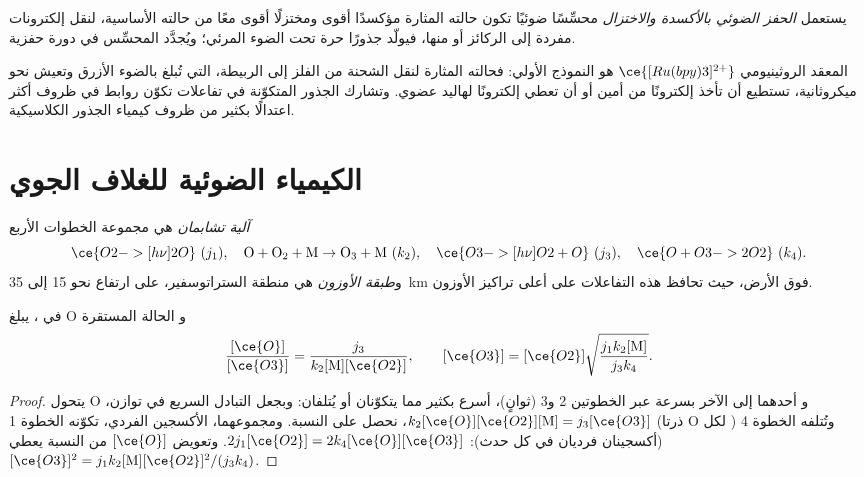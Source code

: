 \begin{definition}\label{def:b3:photochemistry:photoredox}
يستعمل \emph{الحفز الضوئي بالأكسدة والاختزال} محسِّسًا ضوئيًا
تكون حالته المثارة مؤكسدًا أقوى ومختزلًا أقوى معًا من
حالته الأساسية، لنقل إلكترونات مفردة إلى الركائز أو منها، فيولّد
جذورًا حرة تحت الضوء المرئي؛ ويُجدَّد المحسِّس في دورة
حفزية.
\end{definition}

المعقد الروثينيومي $\ce{[Ru(bpy)3]^{2+}}$ هو النموذج الأولي: فحالته المثارة لنقل الشحنة من الفلز إلى
الربيطة، التي تُبلغ بالضوء الأزرق وتعيش نحو
ميكروثانية، تستطيع أن تأخذ إلكترونًا من أمين أو أن تعطي إلكترونًا لهاليد
عضوي. وتشارك الجذور المتكوّنة في تفاعلات تكوّن روابط في
ظروف أكثر اعتدالًا بكثير من ظروف كيمياء الجذور الكلاسيكية.

\section{الكيمياء الضوئية للغلاف الجوي}

\begin{definition}\label{def:b3:photochemistry:chapman}
\emph{آلية تشابمان} هي مجموعة الخطوات الأربع
\[
  \ce{O2 ->[h\nu] 2 O}\ (j_1), \quad \mathrm{O + O_2 + M \to O_3 + M}\ (k_2), \quad
  \ce{O3 ->[h\nu] O2 + O}\ (j_3), \quad \ce{O + O3 -> 2 O2}\ (k_4).
\]
و\emph{طبقة الأوزون} هي منطقة الستراتوسفير، على ارتفاع
نحو 15 إلى \qty{35}{km} فوق الأرض، حيث تحافظ هذه التفاعلات على أعلى
تراكيز الأوزون.
\end{definition}

\begin{theorem}\label{thm:b3:photochemistry:chapman}
في ، يبلغ O و الحالة المستقرة
\[
  \frac{[\ce{O}]}{[\ce{O3}]} = \frac{j_3}{k_2[\mathrm M][\ce{O2}]}, \qquad
  [\ce{O3}] = [\ce{O2}]\sqrt{\frac{j_1k_2[\mathrm M]}{j_3k_4}} .
\]
\end{theorem}

\begin{proof}
يتحول O و أحدهما إلى الآخر بسرعة عبر الخطوتين 2 و3 (ثوانٍ)، أسرع بكثير
مما يتكوّنان أو يُتلفان: وبجعل التبادل السريع في توازن،
$k_2[\ce{O}][\ce{O2}][\mathrm M] = j_3[\ce{O3}]$، نحصل على النسبة. ومجموعهما، الأكسجين الفردي، تكوّنه
الخطوة 1 (ذرتا O لكل ) وتُتلفه الخطوة 4 (أكسجينان فرديان في كل حدث):
$2j_1[\ce{O2}] = 2k_4[\ce{O}][\ce{O3}]$. وتعويض $[\ce{O}]$ من النسبة يعطي $[\ce{O3}]^2 = j_1k_2[\mathrm M][\ce{O2}]^2/(j_3k_4)$.
\end{proof}

